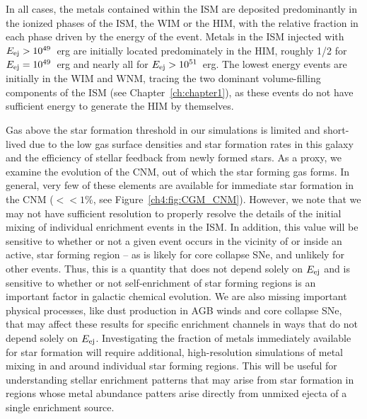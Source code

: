 In all cases, the metals contained within the ISM are deposited predominantly in the ionized phases of the ISM, the WIM or the HIM, with the relative fraction in each phase driven by the energy of the event. Metals in the ISM injected with $E_{\rm ej} > 10^{49}$~erg are initially located predominately in the HIM, roughly 1/2 for $E_{\rm ej} = 10^{49}$~erg and nearly all for $E_{\rm ej} > 10^{51}$~erg. The lowest energy events are initially in the WIM and WNM, tracing the two dominant volume-filling components of the ISM (see Chapter~\ref{ch:chapter1}), as these events do not have sufficient energy to generate the HIM by themselves.

Gas above the star formation threshold in our simulations is limited and short-lived due to the low gas surface densities and star formation rates in this galaxy and the efficiency of stellar feedback from newly formed stars. As a proxy, we examine the evolution of the CNM, out of which the star forming gas forms. In general, very few of these elements are available for immediate star formation in the CNM ($<< 1\%$, see Figure~\ref{ch4:fig:CGM_CNM}). However, we note that we may not have sufficient resolution to properly resolve the details of the initial mixing of individual enrichment events in the ISM. In addition, this value will be sensitive to whether or not a given event occurs in the vicinity of or inside an active, star forming region -- as is likely for core collapse SNe, and unlikely for other events. Thus, this is a quantity that does not depend solely on $E_{\rm ej}$ and is sensitive to whether or not self-enrichment of star forming regions is an important factor in galactic chemical evolution. We are also missing important physical processes, like dust production in AGB winds and core collapse SNe, that may affect these results for specific enrichment channels in ways that do not depend solely on $E_{\rm ej}$. Investigating the fraction of metals immediately available for star formation will require additional, high-resolution simulations of metal mixing in and around individual star forming regions. This will be useful for understanding stellar enrichment patterns that may arise from star formation in regions whose metal abundance patters arise directly from unmixed ejecta of a single enrichment source. %

